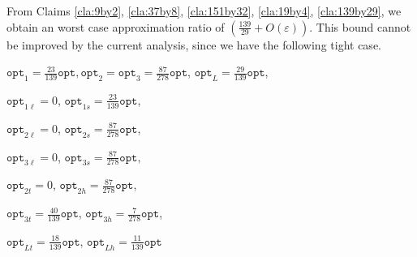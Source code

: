 \documentclass[10pt,a4paper]{amsart}
\renewcommand{\epsilon}{\varepsilon} %
\newtheorem{claim}[theorem]{Claim}
\theoremstyle{definition}
\newcommand{\alg}{\mathtt{opt}_{\mathrm{gs}}}
\newcommand{\opt}{\mathtt{opt}}
\newcommand{\optonel}{\mathtt{opt}_{1\ell}}
\newcommand{\optones}{\mathtt{opt}_{1s}}
\newcommand{\opttwol}{\mathtt{opt}_{2\ell}}
\newcommand{\opttwos}{\mathtt{opt}_{2s}}
\newcommand{\optthreel}{\mathtt{opt}_{3\ell}}
\newcommand{\optthrees}{\mathtt{opt}_{3s}}
\newcommand{\opttwot}{\mathtt{opt}_{2t}}
\newcommand{\opttwoh}{\mathtt{opt}_{2h}}
\newcommand{\optthreet}{\mathtt{opt}_{3t}}
\newcommand{\optthreeh}{\mathtt{opt}_{3h}}
\newcommand{\optlt}{\mathtt{opt}_{Lt}}
\newcommand{\optlh}{\mathtt{opt}_{Lh}}
\begin{document}
\begin{enumerate}
    From Claims \ref{cla:9by2}, \ref{cla:37by8}, \ref{cla:151by32}, \ref{cla:19by4}, \ref{cla:139by29}, we obtain an worst case approximation ratio of $\left(\frac{139}{29}+O(\epsilon)\right)$. This bound cannot be improved by the current analysis, since we have the following tight case.

    $\displaystyle\opt_1 = \frac{23}{139}\opt, \opt_2=\opt_3 = \frac{87}{278}\opt$, $\displaystyle\opt_L = \frac{29}{139}\opt$,
    
    $\displaystyle\optonel = 0$, $\displaystyle\optones = \frac{23}{139}\opt$,
    
    $\displaystyle\opttwol = 0$, $\displaystyle\opttwos = \frac{87}{278}\opt$,
    
    $\optthreel = 0$, $\displaystyle\optthrees = \frac{87}{278}\opt$,
    
    $\opttwot = 0$, $\displaystyle\opttwoh = \frac{87}{278}\opt$,
    
    $\displaystyle\optthreet = \frac{40}{139}\opt$, $\displaystyle\optthreeh = \frac{7}{278}\opt$,
    
    $\displaystyle\optlt = \frac{18}{139}\opt$, $\displaystyle\optlh = \frac{11}{139}\opt$






    




\end{enumerate}
\end{document}
